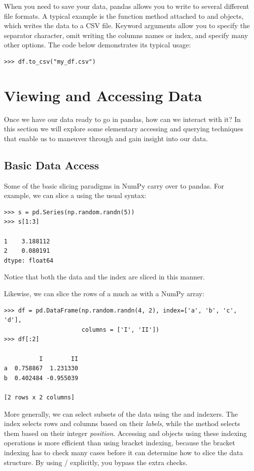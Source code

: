 When you need to save your data, pandas allows you to write to several different
file formats. A typical example is the  function method attached to
 and  objects, which writes the data to a CSV file.
Keyword arguments allow you to specify the separator character, omit writing the
columns names or index, and specify many other options. The code below
demonstrates its typical usage:
\begin{lstlisting}
>>> df.to_csv("my_df.csv")
\end{lstlisting}

\section*{Viewing and Accessing Data}

Once we have our data ready to go in pandas, how can we interact with it?
In this section we will explore some elementary accessing and querying
techniques that enable us to maneuver through and gain insight into our data.

\subsection*{Basic Data Access}
Some of the basic slicing paradigms in NumPy carry over to pandas.
For example, we can slice a  using the usual syntax:
\begin{lstlisting}
>>> s = pd.Series(np.random.randn(5))
>>> s[1:3]

1    3.188112
2    0.080191
dtype: float64
\end{lstlisting}
Notice that both the data and the index are sliced in this manner.

Likewise, we can slice the rows of a  much as with a NumPy array:
\begin{lstlisting}
>>> df = pd.DataFrame(np.random.randn(4, 2), index=['a', 'b', 'c', 'd'],
                      columns = ['I', 'II'])
>>> df[:2]

          I        II
a  0.758867  1.231330
b  0.402484 -0.955039

[2 rows x 2 columns]
\end{lstlisting}

More generally, we can select subsets of the data using the  and
 indexers. The  index selects rows and columns based on
their \emph{labels}, while the  method selects them based on their
integer \emph{position}. Accessing  and  objects
using these indexing operations is more efficient than using bracket indexing,
because the bracket indexing has to check many cases before it can determine how
to slice the data structure. By using / explicitly, you bypass
the extra checks.

